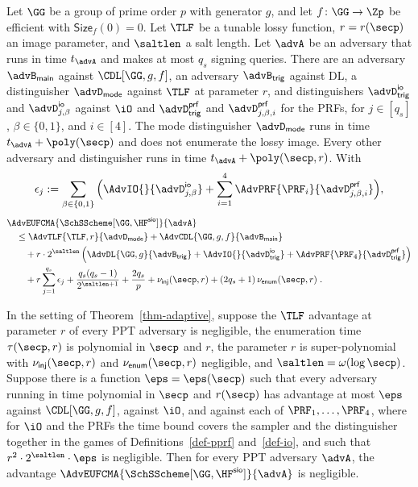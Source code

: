 \begin{theorem} \label{thm-adaptive}
Let $\GG$ be a group of prime order $p$ with generator $g$, and let $f \colon \GG \to \Zp$ be efficient with $\mathsf{Size}_f(0) = 0$. Let $\TLF$ be a tunable lossy function, $r = r(\secp)$ an image parameter, and $\saltlen$ a salt length. Let $\advA$ be an adversary that runs in time $t_{\advA}$ and makes at most $q_s$ signing queries. There are an adversary $\advB_{\mathsf{main}}$ against $\CDL[\GG,g,f]$, an adversary $\advB_{\mathsf{trig}}$ against DL, a distinguisher $\advD_{\mathsf{mode}}$ against $\TLF$ at parameter $r$, and distinguishers $\advD_{\mathsf{trig}}^{\mathsf{io}}$ and $\advD^{\mathsf{io}}_{j,\beta}$ against $\iO$ and $\advD_{\mathsf{trig}}^{\mathsf{prf}}$ and $\advD^{\mathsf{prf}}_{j,\beta,i}$ for the PRFs, for $j \in [q_s]$, $\beta \in \{0,1\}$, and $i \in [4]$. The mode distinguisher $\advD_{\mathsf{mode}}$ runs in time $t_{\advA}+\poly(\secp)$ and does not enumerate the lossy image. Every other adversary and distinguisher runs in time $t_{\advA}+\poly(\secp,r)$. With
$$
\epsilon_j
:=
\sum_{\beta\in\{0,1\}}
\Big(
\AdvIO{}{\advD^{\mathsf{io}}_{j,\beta}}
+\sum_{i=1}^4
\AdvPRF{\PRF_i}{\advD^{\mathsf{prf}}_{j,\beta,i}}
\Big),
$$
$$
\begin{aligned}
&\AdvEUFCMA{\SchSScheme[\GG,\HF^{\mathsf{sio}}]}{\advA}\\
&\quad\le
\AdvTLF{\TLF,r}{\advD_{\mathsf{mode}}}
+\AdvCDL{\GG,g,f}{\advB_{\mathsf{main}}}\\
&\qquad+r\cdot2^{\saltlen}\left(
\AdvDL{\GG,g}{\advB_{\mathsf{trig}}}
+\AdvIO{}{\advD_{\mathsf{trig}}^{\mathsf{io}}}
+\AdvPRF{\PRF_4}{\advD_{\mathsf{trig}}^{\mathsf{prf}}}
\right)\\
&\qquad+r\sum_{j=1}^{q_s}\epsilon_j
+\frac{q_s(q_s-1)}{2^{\saltlen+1}}
+\frac{2q_s}{p}
+\nu_{\mathsf{inj}}(\secp,r)
+(2q_s+1)\,\nu_{\mathsf{enum}}(\secp,r) \;.
\end{aligned}
$$
\end{theorem}

\begin{corollary} \label{cor-adaptive}
In the setting of Theorem~\ref{thm-adaptive}, suppose the $\TLF$ advantage at parameter $r$ of every PPT adversary is negligible, the enumeration time $\tau(\secp,r)$ is polynomial in $\secp$ and $r$, the parameter $r$ is super-polynomial with $\nu_{\mathsf{inj}}(\secp,r)$ and $\nu_{\mathsf{enum}}(\secp,r)$ negligible, and $\saltlen = \omega(\log\secp)$. Suppose there is a function $\eps = \eps(\secp)$ such that every adversary running in time polynomial in $\secp$ and $r(\secp)$ has advantage at most $\eps$ against $\CDL[\GG,g,f]$, against $\iO$, and against each of $\PRF_1,\ldots,\PRF_4$, where for $\iO$ and the PRFs the time bound covers the sampler and the distinguisher together in the games of Definitions~\ref{def-pprf} and~\ref{def-io}, and such that $r^2 \cdot 2^{\saltlen} \cdot \eps$ is negligible. Then for every PPT adversary $\advA$, the advantage $\AdvEUFCMA{\SchSScheme[\GG, \HF^{\mathsf{sio}}]}{\advA}$ is negligible.
\end{corollary}

